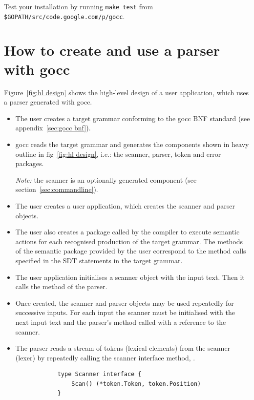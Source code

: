 \documentclass[12pt]{article}
\begin{document}
	Test your installation by running \verb|make test| from \verb|$GOPATH/src/code.google.com/p/gocc|.

\section{How to create and use a parser with gocc}
	Figure~\ref{fig:hl design} shows the high-level design of a user application, which uses a parser generated with gocc.
	\begin{itemize}
		\item The user creates a target grammar conforming to the gocc BNF standard (see appendix~\ref{sec:gocc bnf}).

		\item gocc reads the target grammar and generates the components shown in heavy outline in fig~\ref{fig:hl design}, i.e.: the scanner, parser, token and error packages. 

		{\em Note:} the scanner is an optionally generated component (see section~\ref{sec:commandline}).

		\item The user creates a user application, which creates the scanner and parser objects. 

		\item The user also creates a package called by the compiler to execute semantic actions for each recognised production of the target grammar. The methods of the semantic package provided by the user correspond to the method calls specified in the SDT statements in the target grammar.

		\item The user application initialises a scanner object with the input text. Then it calls the  method of the parser.

		\item Once created, the scanner and parser objects may be used repeatedly for successive inputs. For each input the scanner must be initialised with the next input text and the parser's  method called with a reference to the scanner.	

		\item The parser reads a stream of tokens (lexical elements) from the scanner (lexer) by repeatedly calling the scanner interface method, . 

		\begin{verbatim}
			type Scanner interface {
			    Scan() (*token.Token, token.Position)
			}
		\end{verbatim}


\end{itemize}
\end{document}
